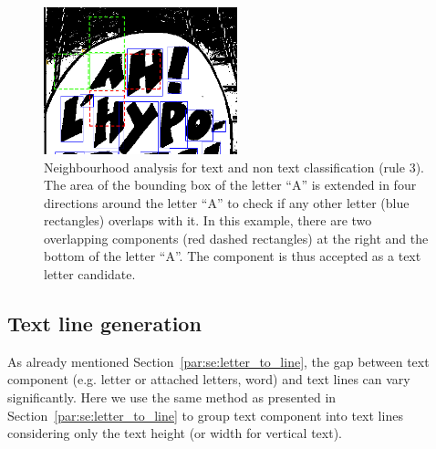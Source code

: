 	\begin{figure}[h!]	%
	  \centering
		\includegraphics[width=0.50\textwidth]{4_direction.png}
		\caption[Text candidate region neighbourhood analysis]{Neighbourhood analysis for text and non text classification (rule 3). The area of the bounding box of the letter ``A'' is extended in four directions around the letter ``A'' to check if any other letter (blue rectangles) overlaps with it. In this example, there are two overlapping components (red dashed rectangles) at the right and the bottom of the letter ``A''. The component is thus accepted as a text letter candidate.}
		\label{fig:in:4_direction}
	\end{figure}


\subsection{Text line generation} %
\label{sub:in:text_line_generation}
As already mentioned Section~\ref{par:se:letter_to_line}, the gap between text component (e.g. letter or attached letters, word) and text lines can vary significantly.
Here we use the same method as presented in Section~\ref{par:se:letter_to_line} to group text component into text lines considering only the text height (or width for vertical text).



